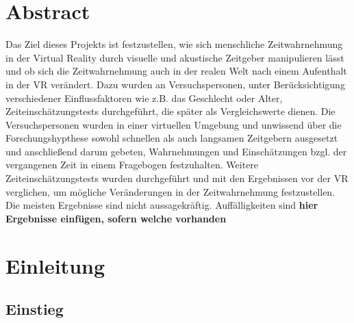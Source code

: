 \documentclass{Paper}
\begin{document}
\maketitle


\tableofcontents
\clearpage




\section*{Abstract}

Das Ziel dieses Projekts ist festzustellen, wie sich menschliche Zeitwahrnehmung in der Virtual Reality durch visuelle und akustische Zeitgeber manipulieren lässt und ob sich die Zeitwahrnehmung auch in der realen Welt nach einem Aufenthalt in der VR verändert. 
Dazu wurden an Versuchspersonen, unter Berücksichtigung verschiedener Einflussfaktoren wie z.B. das Geschlecht oder Alter, Zeiteinschätzungstests durchgeführt, die später als Vergleichswerte dienen.
Die Versuchspersonen wurden in einer virtuellen Umgebung und unwissend über die Forschungshypthese sowohl schnellen als auch langsamen Zeitgebern ausgesetzt und anschließend darum gebeten, Wahrnehmungen und Einschätzungen bzgl. der vergangenen Zeit in einem Fragebogen festzuhalten. Weitere Zeiteinschätzungstests wurden durchgeführt und mit den Ergebnissen vor der VR verglichen, um mögliche Veränderungen in der Zeitwahrnehmung festzustellen. \\
Die meisten Ergebnisse sind nicht aussagekräftig. Auffälligkeiten sind \textbf{hier Ergebnisse einfügen, sofern welche vorhanden}


\section{Einleitung}
\subsection{Einstieg}
\end{document}
